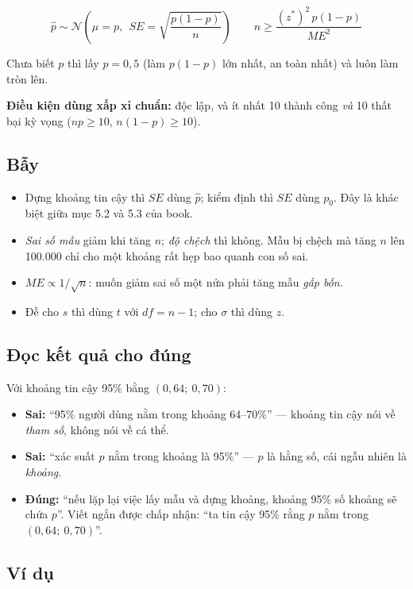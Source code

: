 \documentclass[11pt]{article}
\begin{document}
\[
\hat{p} \sim \mathcal{N}\!\left(\mu = p,\ \ SE=\sqrt{\frac{p(1-p)}{n}}\right)
\qquad
n \ge \frac{(z^{*})^2\,p(1-p)}{ME^2}
\]

Chưa biết $p$ thì lấy $p=0{,}5$ (làm $p(1-p)$ lớn nhất, an toàn nhất) và luôn làm
tròn lên.

\textbf{Điều kiện dùng xấp xỉ chuẩn:} độc lập, và ít nhất 10 thành công \emph{và}
10 thất bại kỳ vọng ($np \ge 10$, $n(1-p) \ge 10$).

\subsection*{Bẫy}

\begin{itemize}
\item Dựng khoảng tin cậy thì $SE$ dùng $\hat p$; kiểm định thì $SE$ dùng $p_0$.
      Đây là khác biệt giữa mục 5.2 và 5.3 của book.
\item \emph{Sai số mẫu} giảm khi tăng $n$; \emph{độ chệch} thì không. Mẫu bị chệch
      mà tăng $n$ lên 100.000 chỉ cho một khoảng rất hẹp bao quanh con số sai.
\item $ME \propto 1/\sqrt{n}$: muốn giảm sai số một nửa phải tăng mẫu \emph{gấp bốn}.
\item Đề cho $s$ thì dùng $t$ với $df=n-1$; cho $\sigma$ thì dùng $z$.
\end{itemize}

\subsection*{Đọc kết quả cho đúng}

Với khoảng tin cậy 95\% bằng $(0{,}64;\ 0{,}70)$:

\begin{itemize}
\item \textbf{Sai:} ``95\% người dùng nằm trong khoảng 64--70\%'' --- khoảng tin
      cậy nói về \emph{tham số}, không nói về cá thể.
\item \textbf{Sai:} ``xác suất $p$ nằm trong khoảng là 95\%'' --- $p$ là hằng số,
      cái ngẫu nhiên là \emph{khoảng}.
\item \textbf{Đúng:} ``nếu lặp lại việc lấy mẫu và dựng khoảng, khoảng 95\% số
      khoảng sẽ chứa $p$''. Viết ngắn được chấp nhận: ``ta tin cậy 95\% rằng $p$
      nằm trong $(0{,}64;\ 0{,}70)$''.
\end{itemize}

\subsection*{Ví dụ}
\end{document}
